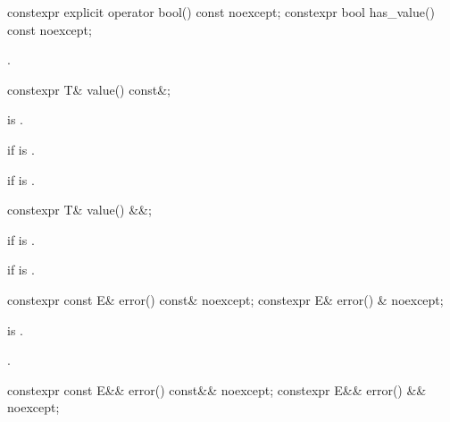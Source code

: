 %
%
\begin{itemdecl}
constexpr explicit operator bool() const noexcept;
constexpr bool has_value() const noexcept;
\end{itemdecl}

\begin{itemdescr}
\pnum
\returns
{}.
\end{itemdescr}

%
\begin{itemdecl}
constexpr T& value() const&;
\end{itemdecl}

\begin{itemdescr}
\pnum
\mandates
{} is .

\pnum
\returns
{} if  is .

\pnum
\throws
{} if  is .
\end{itemdescr}

%
\begin{itemdecl}
constexpr T& value() &&;
\end{itemdecl}

\begin{itemdescr}
\pnum
\returns
{} if  is .

\pnum
\throws
{} if  is .
\end{itemdescr}

%
\begin{itemdecl}
constexpr const E& error() const& noexcept;
constexpr E& error() & noexcept;
\end{itemdecl}

\begin{itemdescr}
\pnum
\expects
{} is .

\pnum
\returns
{}.
\end{itemdescr}

%
\begin{itemdecl}
constexpr const E&& error() const&& noexcept;
constexpr E&& error() && noexcept;
\end{itemdecl}

